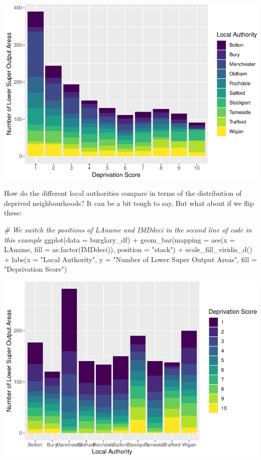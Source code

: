 \documentclass[
]{book}
\newenvironment{Shaded}{\begin{snugshade}}{\end{snugshade}}
\newcommand{\AttributeTok}[1]{\textcolor[rgb]{0.77,0.63,0.00}{#1}}
\newcommand{\CommentTok}[1]{\textcolor[rgb]{0.56,0.35,0.01}{\textit{#1}}}
\newcommand{\FunctionTok}[1]{\textcolor[rgb]{0.00,0.00,0.00}{#1}}
\newcommand{\NormalTok}[1]{#1}
\newcommand{\SpecialCharTok}[1]{\textcolor[rgb]{0.00,0.00,0.00}{#1}}
\newcommand{\StringTok}[1]{\textcolor[rgb]{0.31,0.60,0.02}{#1}}
\begin{document}
\includegraphics{03-data-visualisation_files/figure-latex/unnamed-chunk-14-1.pdf}

How do the different local authorities compare in terms of the distribution of deprived neighbourhoods? It can be a bit tough to say. But what about if we flip these:

\begin{Shaded}
\begin{Highlighting}[]
\CommentTok{\# We switch the positions of LAname and IMDdeci in the second line of code in this example}
\FunctionTok{ggplot}\NormalTok{(}\AttributeTok{data =}\NormalTok{ burglary\_df) }\SpecialCharTok{+} 
  \FunctionTok{geom\_bar}\NormalTok{(}\AttributeTok{mapping =} \FunctionTok{aes}\NormalTok{(}\AttributeTok{x =}\NormalTok{ LAname, }\AttributeTok{fill =} \FunctionTok{as.factor}\NormalTok{(IMDdeci)), }\AttributeTok{position =} \StringTok{"stack"}\NormalTok{) }\SpecialCharTok{+}
  \FunctionTok{scale\_fill\_viridis\_d}\NormalTok{() }\SpecialCharTok{+} 
  \FunctionTok{labs}\NormalTok{(}\AttributeTok{x =} \StringTok{"Local Authority"}\NormalTok{, }\AttributeTok{y =} \StringTok{"Number of Lower Super Output Areas"}\NormalTok{, }\AttributeTok{fill =} \StringTok{"Deprivation Score"}\NormalTok{)}
\end{Highlighting}
\end{Shaded}

\includegraphics{03-data-visualisation_files/figure-latex/unnamed-chunk-15-1.pdf}
\end{document}
